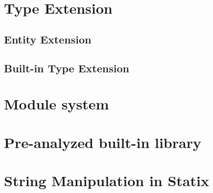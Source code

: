   \section{\label{sec:type-extension}Type Extension}

    \subsection{\label{subsec:entity-extension}Entity Extension}

    \subsection{\label{subsec:built-in-extension}Built-in Type Extension}

  \section{\label{sec:module-system}Module system}

  \section{\label{sec:built-in-library}Pre-analyzed built-in library}

  \section{\label{sec:statix-string-manipulation}String Manipulation in Statix}
